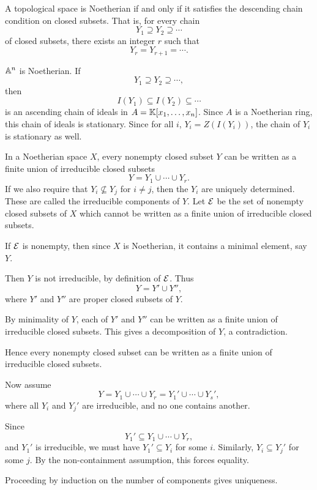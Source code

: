 \begin{definition}
    A topological space is Noetherian if and only if it satisfies the descending chain condition on closed subsets.
    That is, for every chain
    \[
        Y_1\supseteq Y_2\supseteq \cdots
    \]
    of closed subsets, there exists an integer $r$ such that
    \[
        Y_r = Y_{r+1} = \cdots.
    \]
\end{definition}

$\aa^n$ is Noetherian.
If
\[
    Y_1\supseteq Y_2\supseteq \cdots,
\]
then
\[
    I(Y_1)\subseteq I(Y_2)\subseteq \cdots
\]
is an ascending chain of ideals in $A = \kk[\reptiln{x}{n}]$.
Since $A$ is a Noetherian ring, this chain of ideals is stationary.
Since for all $i$, $Y_i = Z(I(Y_i))$, the chain of $Y_i$ is stationary as well.

\begin{proposition}{
    In a Noetherian space $X$, every nonempty closed subset $Y$ can be written as a finite union of irreducible closed subsets
    \[
        Y = Y_1\cup\cdots\cup Y_r.
    \]
    If we also require that $Y_i\not\subseteq Y_j$ for $i\neq j$, then the $Y_i$ are uniquely determined.
    These are called the irreducible components of $Y$.
}
    Let $\Epsilon$ be the set of nonempty closed subsets of $X$ which cannot be written as a finite union of irreducible closed subsets.

    If $\Epsilon$ is nonempty, then since $X$ is Noetherian, it contains a minimal element, say $Y$.

    Then $Y$ is not irreducible, by definition of $\Epsilon$.
    Thus
    \[
        Y = Y'\cup Y'',
    \]
    where $Y'$ and $Y''$ are proper closed subsets of $Y$.

    By minimality of $Y$, each of $Y'$ and $Y''$ can be written as a finite union of irreducible closed subsets.
    This gives a decomposition of $Y$, a contradiction.

    Hence every nonempty closed subset can be written as a finite union of irreducible closed subsets.

    Now assume
    \[
        Y = Y_1\cup\cdots\cup Y_r = Y_1'\cup\cdots\cup Y_s',
    \]
    where all $Y_i$ and $Y_j'$ are irreducible, and no one contains another.

    Since
    \[
        Y_1' \subseteq Y_1\cup\cdots\cup Y_r,
    \]
    and $Y_1'$ is irreducible, we must have $Y_1'\subseteq Y_i$ for some $i$.
    Similarly, $Y_i\subseteq Y_j'$ for some $j$.
    By the non-containment assumption, this forces equality.

    Proceeding by induction on the number of components gives uniqueness.
\end{proposition}

